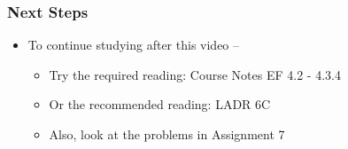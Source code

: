 \documentclass[10pt,english,aspectratio=169]{beamer}
\begin{document}
\begin{frame} \frametitle{Next Steps}

\begin{itemize}
\setlength\itemsep{5mm}
\item To continue studying after this video -- \vspace{2mm}

\begin{itemize}
 \setlength\itemsep{3mm}
 \item Try the required reading: Course Notes EF 4.2 - 4.3.4
 \item Or the recommended reading: LADR 6C
 \item Also, look at the problems in Assignment 7
\end{itemize}
\end{itemize}


\end{frame}
\end{document}
